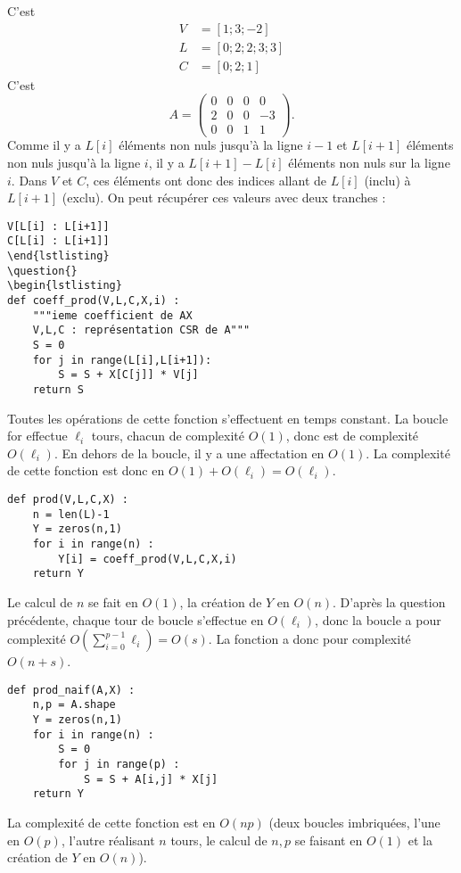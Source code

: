 \exer{}
\setcounter{numques}{0}

\question{} C'est 
\begin{align*}
    V &= [1 ; 3 ; -2 ] \\
    L &= [0 ; 2 ; 2 ; 3 ; 3] \\
    C &= [0 ; 2 ; 1 ]
\end{align*}
\question{} C'est 
\begin{equation*}
    A = \begin{pmatrix} 0 & 0 & 0 & 0 \\ 2 & 0 & 0 & -3 \\ 0 & 0 & 1 & 1 \end{pmatrix}. 
\end{equation*}
\question{} Comme il y a $L[i]$ éléments non nuls jusqu'à la ligne \no$i-1$ et $L[i+1]$ éléments non nuls jusqu'à la ligne \no$i$, il y a $L[i+1] - L[i]$ éléments non nuls sur la ligne \no$i$.
Dans $V$ et $C$, ces éléments ont donc des indices allant de $L[i]$ (inclu) à $L[i+1]$ (exclu). On peut récupérer ces valeurs avec deux tranches : 
\begin{verbatim}
V[L[i] : L[i+1]]
C[L[i] : L[i+1]]
\end{lstlisting}
\question{}
\begin{lstlisting}
def coeff_prod(V,L,C,X,i) : 
    """ieme coefficient de AX
    V,L,C : représentation CSR de A"""
    S = 0
    for j in range(L[i],L[i+1]):
        S = S + X[C[j]] * V[j]
    return S
\end{verbatim}
Toutes les opérations de cette fonction s'effectuent en temps constant. La boucle for effectue $\ell_i$ tours, chacun de complexité $O(1)$, donc est de complexité $O(\ell_i)$. 
En dehors de la boucle, il y a une affectation en $O(1)$. 
La complexité de cette fonction est donc en $O(1) + O(\ell_i) = O(\ell_i)$. 

\question{} 
\begin{lstlisting}
def prod(V,L,C,X) : 
    n = len(L)-1
    Y = zeros(n,1)
    for i in range(n) : 
        Y[i] = coeff_prod(V,L,C,X,i)
    return Y
\end{lstlisting}
Le calcul de $n$ se fait en $O(1)$, la création de $Y$ en $O(n)$. 
D'après la question précédente, chaque tour de boucle s'effectue en $O(\ell_i)$, donc la boucle a pour complexité $O(\sum_{i=0}^{p-1}\ell_i) = O(s)$. 
La fonction a donc pour complexité $O(n+s)$. 

\question{}
\begin{lstlisting}
def prod_naif(A,X) : 
    n,p = A.shape
    Y = zeros(n,1)
    for i in range(n) : 
        S = 0
        for j in range(p) : 
            S = S + A[i,j] * X[j]
    return Y
\end{lstlisting}
La complexité de cette fonction est en $O(np)$ (deux boucles imbriquées, l'une en $O(p)$, l'autre réalisant $n$ tours, le calcul de $n,p$ se faisant en $O(1)$ et la création de $Y$ en $O(n)$).

